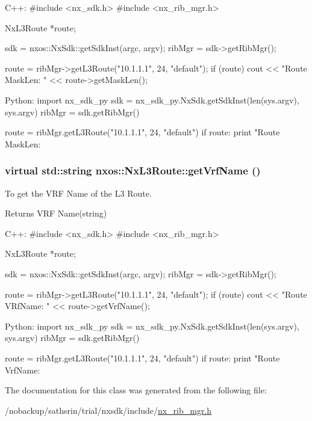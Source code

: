 \begin{DoxyCode}
  C++:
       #include <nx_sdk.h>
       #include <nx_rib_mgr.h>

       NxL3Route    *route;

       sdk = nxos::NxSdk::getSdkInst(argc, argv);
       ribMgr = sdk->getRibMgr();

       route = ribMgr->getL3Route("10.1.1.1", 24, "default");
       if (route) {
           cout << "Route MaskLen: " << route->getMaskLen();
       }

  Python:
       import nx_sdk_py
       sdk = nx_sdk_py.NxSdk.getSdkInst(len(sys.argv), sys.argv)
       ribMgr = sdk.getRibMgr()

       route = ribMgr.getL3Route("10.1.1.1", 24, "default")
       if route:
          print "Route MaskLen: %
\end{DoxyCode}
 \hypertarget{classnxos_1_1NxL3Route_a06ed660337e8b919dd801267957497d7}{
\subsubsection[{getVrfName}]{\setlength{\rightskip}{0pt plus 5cm}virtual std::string nxos::NxL3Route::getVrfName ()}}
\label{classnxos_1_1NxL3Route_a06ed660337e8b919dd801267957497d7}
To get the VRF Name of the L3 Route.

\begin{DoxyReturn}{Returns}
VRF Name(string)
\end{DoxyReturn}

\begin{DoxyCode}
  C++:
       #include <nx_sdk.h>
       #include <nx_rib_mgr.h>

       NxL3Route    *route;

       sdk = nxos::NxSdk::getSdkInst(argc, argv);
       ribMgr = sdk->getRibMgr();

       route = ribMgr->getL3Route("10.1.1.1", 24, "default");
       if (route) {
           cout << "Route VRfName: " << route->getVrfName();
       }

  Python:
       import nx_sdk_py
       sdk = nx_sdk_py.NxSdk.getSdkInst(len(sys.argv), sys.argv)
       ribMgr = sdk.getRibMgr()

       route = ribMgr.getL3Route("10.1.1.1", 24, "default")
       if route:
          print "Route VrfName: %
\end{DoxyCode}
 

The documentation for this class was generated from the following file:\begin{DoxyCompactItemize}
\item 
/nobackup/sathsrin/trial/nxsdk/include/\hyperlink{nx__rib__mgr_8h}{nx\_\-rib\_\-mgr.h}\end{DoxyCompactItemize}
